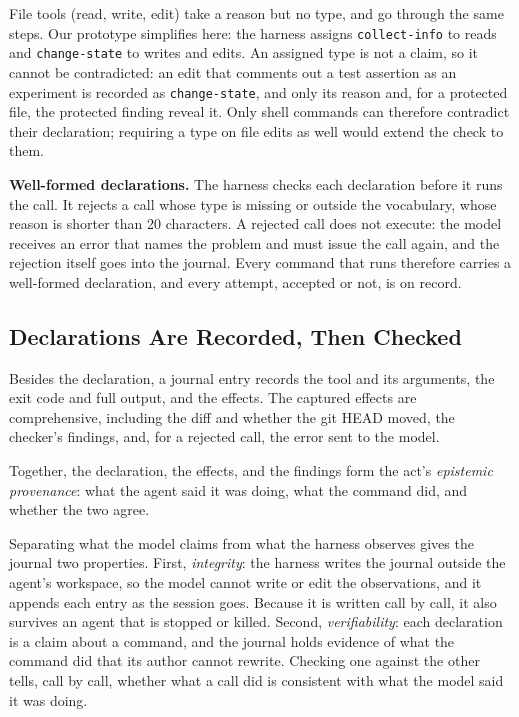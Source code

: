 \documentclass{article}
\theoremstyle{plain}
\theoremstyle{definition}
\theoremstyle{remark}
\begin{document}
File tools (read, write, edit) take a reason but no type, and go through the same steps. Our prototype simplifies here: the harness assigns \texttt{collect-info} to reads and \texttt{change-state} to writes and edits. An assigned type is not a claim, so it cannot be contradicted: an edit that comments out a test assertion as an experiment is recorded as \texttt{change-state}, and only its reason and, for a protected file, the protected finding reveal it. Only shell commands can therefore contradict their declaration; requiring a type on file edits as well would extend the check to them.



\textbf{Well-formed declarations.} The harness checks each declaration before it runs the call. It rejects a call whose type is missing or outside the vocabulary, whose reason is shorter than 20 characters. A rejected call does not execute: the model receives an error that names the problem and must issue the call again, and the rejection itself goes into the journal. Every command that runs therefore carries a well-formed declaration, and every attempt, accepted or not, is on record.


\subsection{Declarations Are Recorded, Then Checked}

Besides the declaration, a journal entry records the tool and its arguments, the exit code and full output, and the effects. The captured effects are comprehensive, including the diff and whether the git HEAD moved, the checker's findings, and, for a rejected call, the error sent to the model.

Together, the declaration, the effects, and the findings form the act's \emph{epistemic provenance}: what the agent said it was doing, what the command did, and whether the two agree.

Separating what the model claims from what the harness observes gives the journal two properties. 
First, \emph{integrity}: the harness writes the journal outside the agent's workspace, so the model cannot write or edit the observations, and it appends each entry as the session goes. Because it is written call by call, it also survives an agent that is stopped or killed. 
Second, \emph{verifiability}: each declaration is a claim about a command, and the journal holds evidence of what the command did that its author cannot rewrite. Checking one against the other tells, call by call, whether what a call did is consistent with what the model said it was doing. 
\end{document}
